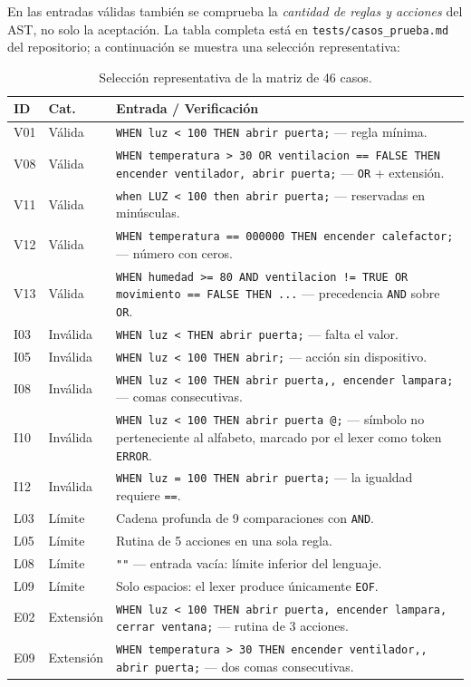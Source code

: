\documentclass[12pt,a4paper]{article}
\begin{document}
En las entradas válidas también se comprueba la \emph{cantidad de reglas y
acciones} del AST, no solo la aceptación. La tabla completa está en
\texttt{tests/casos\_prueba.md} del repositorio; a continuación se muestra
una selección representativa:

\begin{longtable}{llp{7.2cm}}
\caption{Selección representativa de la matriz de 46 casos.}
\label{tab:casos}\\
\toprule
\textbf{ID} & \textbf{Cat.} & \textbf{Entrada / Verificación} \\
\midrule
\endhead
V01 & Válida & \texttt{WHEN luz < 100 THEN abrir puerta;} — regla mínima. \\
V08 & Válida & \texttt{WHEN temperatura > 30 OR ventilacion == FALSE THEN encender ventilador, abrir puerta;} — \texttt{OR} + extensión. \\
V11 & Válida & \texttt{when LUZ < 100 then abrir puerta;} — reservadas en minúsculas. \\
V12 & Válida & \texttt{WHEN temperatura == 000000 THEN encender calefactor;} — número con ceros. \\
V13 & Válida & \texttt{WHEN humedad >= 80 AND ventilacion != TRUE OR movimiento == FALSE THEN ...} — precedencia \texttt{AND} sobre \texttt{OR}. \\
I03 & Inválida & \texttt{WHEN luz < THEN abrir puerta;} — falta el valor. \\
I05 & Inválida & \texttt{WHEN luz < 100 THEN abrir;} — acción sin dispositivo. \\
I08 & Inválida & \texttt{WHEN luz < 100 THEN abrir puerta,, encender lampara;} — comas consecutivas. \\
I10 & Inválida & \texttt{WHEN luz < 100 THEN abrir puerta @;} — símbolo no perteneciente al alfabeto, marcado por el lexer como token \texttt{ERROR}. \\
I12 & Inválida & \texttt{WHEN luz = 100 THEN abrir puerta;} — la igualdad requiere \texttt{==}. \\
L03 & Límite & Cadena profunda de 9 comparaciones con \texttt{AND}. \\
L05 & Límite & Rutina de 5 acciones en una sola regla. \\
L08 & Límite & \texttt{""} — entrada vacía: límite inferior del lenguaje. \\
L09 & Límite & Solo espacios: el lexer produce únicamente \texttt{EOF}. \\
E02 & Extensión & \texttt{WHEN luz < 100 THEN abrir puerta, encender lampara, cerrar ventana;} — rutina de 3 acciones. \\
E09 & Extensión & \texttt{WHEN temperatura > 30 THEN encender ventilador,, abrir puerta;} — dos comas consecutivas. \\
\bottomrule
\end{longtable}
\end{document}
